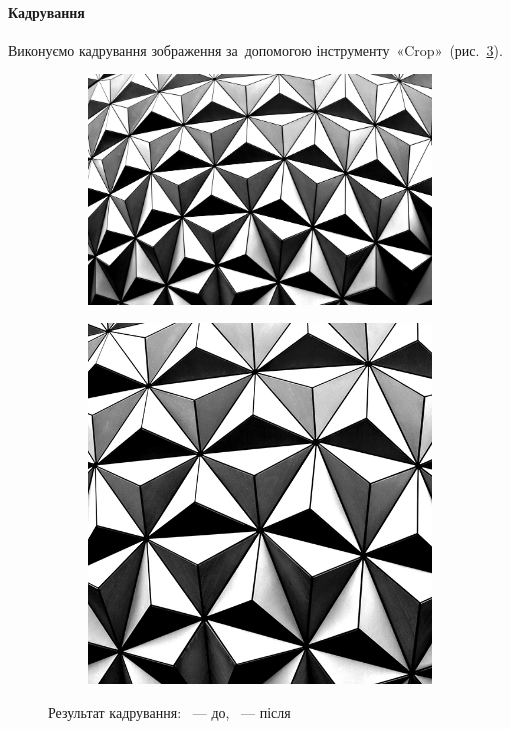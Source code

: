 \documentclass[
	a4paper,
	oneside,
	BCOR = 10mm,
	DIV = 12,
	12pt,
	headings = normal,
]{scrartcl}
\begin{document}
		\paragraph{Кадрування}
			Виконуємо кадрування зображення за~допомогою інструменту~\textenglish{«Crop»}~(рис.~\ref{fig:03-crop}).
			\begin{figure}[!htbp]
				\centering
				\begin{subfigure}{0.5\columnwidth}
					\centering
					\includegraphics[height = 6\baselineskip]{./assets/abstract-abstract-photo-art-1070345.jpg}
					\caption{}
					\label{subfig:03-01-crop}
				\end{subfigure}%
				\begin{subfigure}{0.5\columnwidth}
					\centering
					\includegraphics[height = 6\baselineskip]{./assets/y03s01-multimedia-lab-01-p01-03-crop.jpg}
					\caption{}
					\label{subfig:03-02-crop}
				\end{subfigure}%
				\caption{Результат кадрування: ~— до, ~— після}
				\label{fig:03-crop}
			\end{figure}
\end{document}
